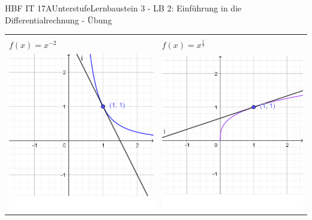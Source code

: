 \documentclass[oneside,openany,headings=optiontotoc,11pt,numbers=noenddot]{scrreprt}
\begin{document}
\begin{worksheet}{HBF IT 17A}{Unterstufe}{Lernbaustein 3 - LB 2: Einführung in die Differentialrechnung - Übung}
\begin{framed}
\begin{center}
\begin{tabularx}{\textwidth}{XX}
					\hline\\
					\(f(x) = x^{-2}\) & \(f(x) = x^{\frac{1}{3}}\)\\		
					\includegraphics[scale=0.3]{Bilder/Gt.png} & \includegraphics[scale=0.3]{Bilder/Fut.png}\\

\end{tabularx}
\end{center}
\end{framed}
\end{worksheet}
\end{document}
